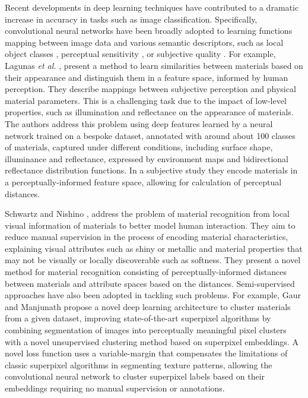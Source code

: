 Recent developments in deep learning techniques have contributed to a dramatic increase in accuracy in tasks such as image classification. Specifically, convolutional neural networks have been broadly adopted to learning functions mapping between image data and various semantic descriptors, such as local object classes \cite{long2015fully}, perceptual sensitivity \cite{Dolhasz_2020_CVPR}, or subjective quality \cite{bosse2017deep}. For example, Lagunas \textit{et al.} \cite{lagunas2019similarity}, present a method to learn similarities between materials based on their appearance and distinguish them in a feature space, informed by human perception. They describe mappings between subjective perception and physical material parameters. This is a challenging task due to the impact of low-level properties, such as illumination and reflectance on the appearance of materials. The authors address this problem using deep features learned by a neural network trained on a bespoke dataset, annotated with around about 100 classes of materials, captured under different conditions, including surface shape, illuminance and reflectance, expressed by environment maps and bidirectional reflectance distribution functions. In a subjective study they encode materials in a perceptually-informed feature space, allowing for calculation of perceptual distances.\par
Schwartz and Nishino \cite{schwartz2019recognizing}, address the problem of material recognition from local visual information of materials to better model human interaction. They aim to reduce manual supervision in the process of encoding material characteristics, explaining visual attributes such as shiny or metallic and material properties that may not be visually or locally discoverable such as softness. They present a novel method for material recognition consisting of perceptually-informed distances between materials and attribute spaces based on the distances.
Semi-supervised approaches have also been adopted in tackling such problems. For example, Gaur and Manjunath \cite{gaur2019superpixel} propose a novel deep learning architecture to cluster materials from a given dataset, improving state-of-the-art superpixel algorithms by combining segmentation of images into perceptually meaningful pixel clusters with a novel unsupervised clustering method based on superpixel embeddings. A novel loss function uses a variable-margin that compensates the limitations of classic superpixel algorithms in segmenting texture patterns, allowing the convolutional neural network to cluster superpixel labels based on their embeddings requiring no manual supervision or annotations.\par%


